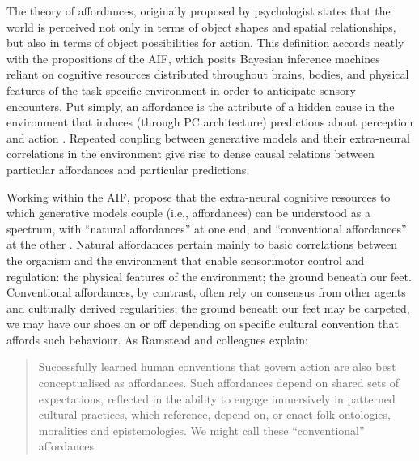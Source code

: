 \begin{CJK}{UTF8}{gbsn}
The theory of affordances, originally proposed by psychologist \textcite{Gibson1979} states that the world is perceived not only in terms of object shapes and spatial relationships, but also in terms of object possibilities for action.  This definition accords neatly with the propositions of the AIF, which posits Bayesian inference machines reliant on cognitive resources distributed throughout brains, bodies, and physical features of the task-specific environment in order to anticipate sensory encounters.  Put simply, an affordance is the attribute of a hidden cause in the environment that induces (through PC architecture) predictions about perception and action \citep[908]{Pezzulo2013}.  Repeated coupling between generative models and their extra-neural correlations in the environment give rise to dense causal relations between particular affordances and particular predictions.

Working within the AIF, \textcite[7]{Ramstead2016} propose that the extra-neural cognitive resources to which generative models couple (i.e., affordances) can be understood as a spectrum, with ``natural affordances'' at one end, and ``conventional affordances'' at the other \citep{Ramstead2016}.  Natural affordances pertain mainly to basic correlations between the organism and the environment that enable sensorimotor control and regulation: the physical features of the environment; the ground beneath our feet.  Conventional affordances, by contrast, often rely on consensus from other agents and culturally derived regularities; the ground beneath our feet may be carpeted, we may have our shoes on or off depending on specific cultural convention that affords such behaviour.  As Ramstead and colleagues explain:

\begin{quote}
  Successfully learned human conventions that govern action are also best conceptualised as affordances. Such affordances depend on shared sets of expectations, reflected in the ability to engage immersively in patterned cultural practices, which reference, depend on, or enact folk ontologies, moralities and epistemologies. We might call these ``conventional'' affordances \citep[7]{Ramstead2016}
\end{quote}


\end{CJK}
